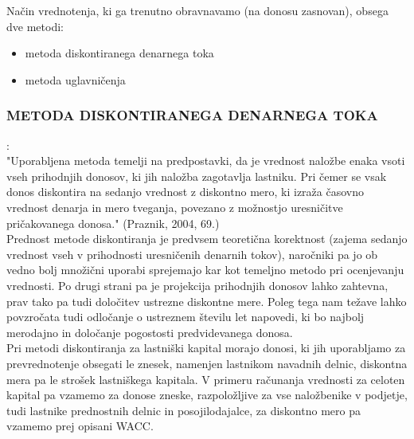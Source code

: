 \documentclass[12pt,a4paper]{amsart}
\theoremstyle{definition} %
\theoremstyle{plain} %
\begin{document}
Način vrednotenja, ki ga trenutno obravnavamo (na donosu zasnovan), obsega dve metodi:
\begin{itemize}
\item metoda diskontiranega denarnega toka
\item metoda uglavničenja
\end{itemize}


\subsubsection{METODA DISKONTIRANEGA DENARNEGA TOKA}:\\

"Uporabljena metoda temelji na predpostavki, da je vrednost naložbe enaka vsoti vseh prihodnjih donosov, ki jih naložba zagotavlja lastniku. Pri čemer se vsak donos diskontira na sedanjo vrednost z diskontno mero, ki izraža časovno vrednost denarja in mero tveganja, povezano z možnostjo uresničitve pričakovanega donosa." (Praznik, 2004, 69.)\\
Prednost metode diskontiranja je predvsem teoretična korektnost (zajema sedanjo vrednost vseh v prihodnosti uresničenih denarnih tokov), naročniki pa jo ob vedno bolj množični uporabi sprejemajo kar kot temeljno metodo pri ocenjevanju vrednosti. Po drugi strani pa je projekcija prihodnjih donosov lahko zahtevna, prav tako pa tudi določitev ustrezne diskontne mere. Poleg tega nam težave lahko povzročata tudi odločanje o ustreznem številu let napovedi, ki bo najbolj merodajno in določanje pogostosti predvidevanega donosa.\\
Pri metodi diskontiranja za lastniški kapital morajo donosi, ki jih uporabljamo za prevrednotenje obsegati le znesek, namenjen lastnikom navadnih delnic, diskontna mera pa le strošek lastniškega kapitala. V primeru računanja vrednosti za celoten kapital pa vzamemo za donose zneske, razpoložljive za vse naložbenike v podjetje, tudi lastnike prednostnih delnic in posojilodajalce, za diskontno mero pa vzamemo prej opisani WACC. \\
\end{document}
